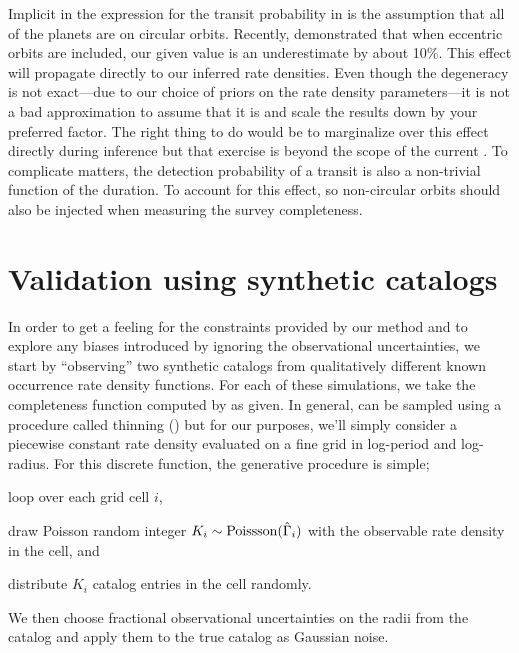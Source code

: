 Implicit in the expression for the transit probability in  is
the assumption that all of the planets are on circular orbits.
Recently, \citet{Kipping:2014} demonstrated that when eccentric orbits are
included, our given value is an underestimate by about 10\%.
This effect will propagate directly to our inferred rate densities.
Even though the degeneracy is not exact---due to our choice of priors on the
rate density parameters---it is not a bad approximation to assume that it is
and scale the results down by your preferred factor.
The right thing to do would be to marginalize over this effect directly during
inference but that exercise is beyond the scope of the current \paper.
To complicate matters, the detection probability of a transit is also a
non-trivial function of the duration.
To account for this effect, so non-circular orbits should also be injected
when measuring the survey completeness.

\section{Validation using synthetic catalogs}

In order to get a feeling for the constraints provided by our method and to
explore any biases introduced by ignoring the observational uncertainties, we
start by ``observing'' two synthetic catalogs from qualitatively different
known occurrence rate density functions.
For each of these simulations, we take the completeness function computed by
\citet{Petigura:2013} as given.
In general,  can be sampled using a procedure called thinning
(\citealt{Lewis:1979}) but for our purposes, we'll simply consider a piecewise
constant rate density evaluated on a fine grid in log-period and log-radius.
For this discrete function, the generative procedure is simple;
\begin{enumerate}
{\item loop over each grid cell $i$,}
{\item draw Poisson random integer $K_i\sim\mathrm{Poissson}(\hat{\Gamma}_i)$
with the observable rate density in the cell, and}
{\item distribute $K_i$ catalog entries in the cell randomly.}
\end{enumerate}
We then choose fractional observational uncertainties on the radii from the
\citet{Petigura:2013} catalog and apply them to the true catalog as Gaussian noise.

